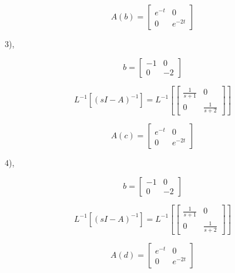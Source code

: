 \documentclass[twocolumn,xelatex,ja=standard,jafont=noto]{bxjsarticle}
\begin{document}
\begin{equation}
	    A(b)={
\left[ \begin{array}{cc}
e^{-t}&0\\
0&e^{-2t}
\end{array}
\right ]}
	\end{equation}
	
	
	3),
	
		\begin{equation}
	    b={
\left[ \begin{array}{cc}
-1&0\\
0&-2
\end{array}
\right ]}
	\end{equation}
	
	
	\begin{equation}
L^{-1}[(sI-A)^{-1}]=L^{-1}[
	    {
\left[ \begin{array}{cc}
\frac{1}{s+1}&0\\
0&\frac{1}{s+2}
\end{array}
\right ]}
	]
\end{equation}

\begin{equation}
	    A(c)={
\left[ \begin{array}{cc}
e^{-t}&0\\
0&e^{-2t}
\end{array}
\right ]}
	\end{equation}
	
	
	4),
	
		\begin{equation}
	    b={
\left[ \begin{array}{cc}
-1&0\\
0&-2
\end{array}
\right ]}
	\end{equation}
	
	
	\begin{equation}
L^{-1}[(sI-A)^{-1}]=L^{-1}[
	    {
\left[ \begin{array}{cc}
\frac{1}{s+1}&0\\
0&\frac{1}{s+2}
\end{array}
\right ]}
	]
\end{equation}

\begin{equation}
	    A(d)={
\left[ \begin{array}{cc}
e^{-t}&0\\
0&e^{-2t}
\end{array}
\right ]}
	\end{equation}
	
\end{document}
